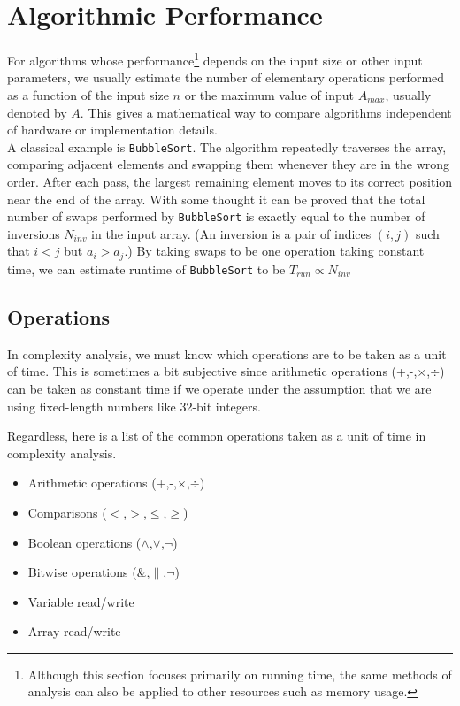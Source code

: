
\chapter{Algorithmic Performance} 

For algorithms whose performance\footnote{Although this section focuses primarily on running 
time, the same methods of analysis can also be applied to other resources such as memory usage.} 
depends on the input size or other input parameters, we usually estimate the number of 
elementary operations performed as a function of the input size \(n\) or the maximum 
value of input $A_{max}$, usually denoted by $A$. This gives a mathematical way 
to compare algorithms independent of hardware or implementation details.\\


\noindent A classical example is \texttt{BubbleSort}. The algorithm repeatedly traverses the 
array, comparing adjacent elements and swapping them whenever they are in the 
wrong order. After each pass, the largest remaining element moves to its 
correct position near the end of the array. With some thought it can be proved 
that the total number of swaps performed by \texttt{BubbleSort} is exactly 
equal to the number of inversions $N_{inv}$ in the input array. 
(An inversion is a pair of indices \((i,j)\) such that \(i<j\) but \(a_i>a_j\).) By taking 
swaps to be one operation taking constant time, we can estimate runtime 
of \texttt{BubbleSort} to be $T_{run}\propto N_{inv}$

\section{Operations}
In complexity analysis, we must know which operations are to be taken as a unit of time. This is sometimes a 
bit subjective since arithmetic operations (+,-,$\times$,$\div$) can be taken as constant time 
if we operate under the assumption that we are using fixed-length numbers like 32-bit integers.

Regardless, here is a list of the common operations taken as a unit of time in complexity analysis.

\begin{itemize}

\item Arithmetic operations (+,-,$\times$,$\div$) 

\item Comparisons ($<$,$>$,$\leq$,$\geq$)

\item Boolean operations ($\land$,$\lor$,$\neg$)

\item Bitwise operations ($\&$,$\|$,$\neg$)

\item Variable read/write

\item Array read/write 

\end{itemize}


